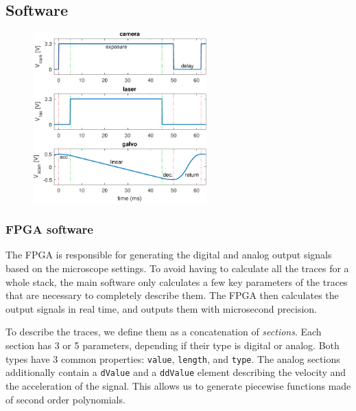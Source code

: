   \subsection{Software}

    \begin{figure}
      \centering
      \includegraphics[width = 0.6\textwidth]{fpgaTraces}
      \label{fig:traces}
    \end{figure}

    \subsubsection{FPGA software}
      The FPGA is responsible for generating the digital and analog output signals based on the microscope settings. To avoid having to calculate all the traces for a whole stack, the main software only calculates a few key parameters of the traces that are necessary to completely describe them. The FPGA then calculates the output signals in real time, and outputs them with microsecond precision.

      To describe the traces, we define them as a concatenation of \textit{sections}. Each section has 3 or 5 parameters, depending if their type is digital or analog. Both types have 3 common properties: \texttt{value}, \texttt{length}, and \texttt{type}. The analog sections additionally contain a \texttt{dValue} and a \texttt{ddValue} element describing the velocity and the acceleration of the signal. This allows us to generate piecewise functions made of second order polynomials.

